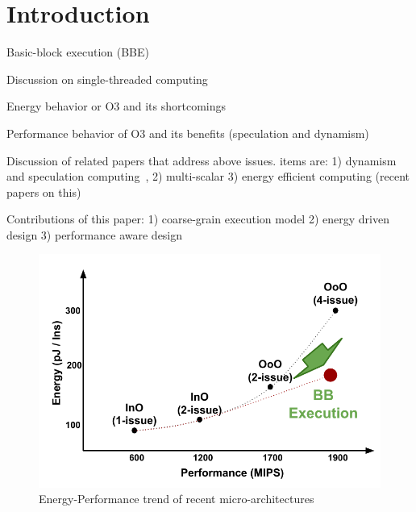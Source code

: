 \section{Introduction} 
\label{sec:intro}
Basic-block execution (BBE)

Discussion on single-threaded computing

Energy behavior or O3 and its shortcomings

Performance behavior of O3 and its benefits (speculation and dynamism)

Discussion of related papers that address above issues. items are: 
1) dynamism and speculation computing~\cite{dyn_specul},
2) multi-scalar
3) energy efficient computing (recent papers on this)

Contributions of this paper: 
1) coarse-grain execution model
2) energy driven design
3) performance aware design


\begin{figure}[h]
	\centering
	\includegraphics[width=1.0\columnwidth]{fig/energy_perf_insight.pdf} 
	\caption{Energy-Performance trend of recent micro-architectures}
	\label{fig:insight}
\end{figure}


